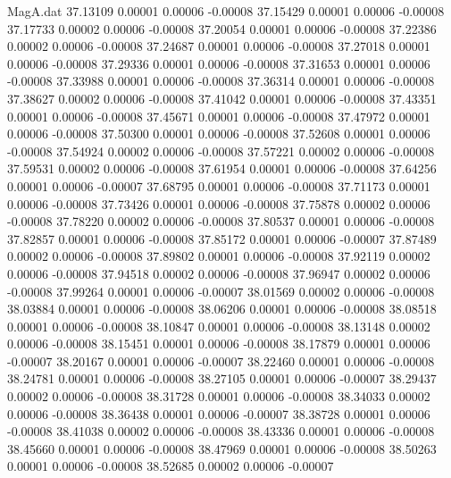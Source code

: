 \begin{filecontents}{MagA.dat}
  37.13109    0.00001    0.00006   -0.00008
  37.15429    0.00001    0.00006   -0.00008
  37.17733    0.00002    0.00006   -0.00008
  37.20054    0.00001    0.00006   -0.00008
  37.22386    0.00002    0.00006   -0.00008
  37.24687    0.00001    0.00006   -0.00008
  37.27018    0.00001    0.00006   -0.00008
  37.29336    0.00001    0.00006   -0.00008
  37.31653    0.00001    0.00006   -0.00008
  37.33988    0.00001    0.00006   -0.00008
  37.36314    0.00001    0.00006   -0.00008
  37.38627    0.00002    0.00006   -0.00008
  37.41042    0.00001    0.00006   -0.00008
  37.43351    0.00001    0.00006   -0.00008
  37.45671    0.00001    0.00006   -0.00008
  37.47972    0.00001    0.00006   -0.00008
  37.50300    0.00001    0.00006   -0.00008
  37.52608    0.00001    0.00006   -0.00008
  37.54924    0.00002    0.00006   -0.00008
  37.57221    0.00002    0.00006   -0.00008
  37.59531    0.00002    0.00006   -0.00008
  37.61954    0.00001    0.00006   -0.00008
  37.64256    0.00001    0.00006   -0.00007
  37.68795    0.00001    0.00006   -0.00008
  37.71173    0.00001    0.00006   -0.00008
  37.73426    0.00001    0.00006   -0.00008
  37.75878    0.00002    0.00006   -0.00008
  37.78220    0.00002    0.00006   -0.00008
  37.80537    0.00001    0.00006   -0.00008
  37.82857    0.00001    0.00006   -0.00008
  37.85172    0.00001    0.00006   -0.00007
  37.87489    0.00002    0.00006   -0.00008
  37.89802    0.00001    0.00006   -0.00008
  37.92119    0.00002    0.00006   -0.00008
  37.94518    0.00002    0.00006   -0.00008
  37.96947    0.00002    0.00006   -0.00008
  37.99264    0.00001    0.00006   -0.00007
  38.01569    0.00002    0.00006   -0.00008
  38.03884    0.00001    0.00006   -0.00008
  38.06206    0.00001    0.00006   -0.00008
  38.08518    0.00001    0.00006   -0.00008
  38.10847    0.00001    0.00006   -0.00008
  38.13148    0.00002    0.00006   -0.00008
  38.15451    0.00001    0.00006   -0.00008
  38.17879    0.00001    0.00006   -0.00007
  38.20167    0.00001    0.00006   -0.00007
  38.22460    0.00001    0.00006   -0.00008
  38.24781    0.00001    0.00006   -0.00008
  38.27105    0.00001    0.00006   -0.00007
  38.29437    0.00002    0.00006   -0.00008
  38.31728    0.00001    0.00006   -0.00008
  38.34033    0.00002    0.00006   -0.00008
  38.36438    0.00001    0.00006   -0.00007
  38.38728    0.00001    0.00006   -0.00008
  38.41038    0.00002    0.00006   -0.00008
  38.43336    0.00001    0.00006   -0.00008
  38.45660    0.00001    0.00006   -0.00008
  38.47969    0.00001    0.00006   -0.00008
  38.50263    0.00001    0.00006   -0.00008
  38.52685    0.00002    0.00006   -0.00007

\end{filecontents}
